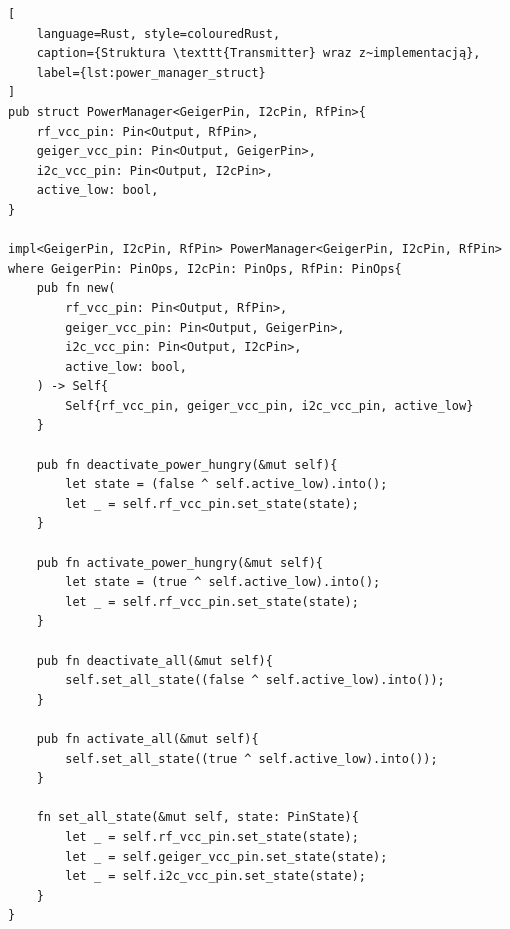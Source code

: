 \begin{lstlisting}[
    language=Rust, style=colouredRust, 
    caption={Struktura \texttt{Transmitter} wraz z~implementacją},
    label={lst:power_manager_struct}
]
pub struct PowerManager<GeigerPin, I2cPin, RfPin>{
    rf_vcc_pin: Pin<Output, RfPin>,
    geiger_vcc_pin: Pin<Output, GeigerPin>,
    i2c_vcc_pin: Pin<Output, I2cPin>,
    active_low: bool,
}

impl<GeigerPin, I2cPin, RfPin> PowerManager<GeigerPin, I2cPin, RfPin>
where GeigerPin: PinOps, I2cPin: PinOps, RfPin: PinOps{
    pub fn new(
        rf_vcc_pin: Pin<Output, RfPin>,
        geiger_vcc_pin: Pin<Output, GeigerPin>,
        i2c_vcc_pin: Pin<Output, I2cPin>,
        active_low: bool,
    ) -> Self{
        Self{rf_vcc_pin, geiger_vcc_pin, i2c_vcc_pin, active_low}
    }

    pub fn deactivate_power_hungry(&mut self){
        let state = (false ^ self.active_low).into();
        let _ = self.rf_vcc_pin.set_state(state);
    }

    pub fn activate_power_hungry(&mut self){
        let state = (true ^ self.active_low).into();
        let _ = self.rf_vcc_pin.set_state(state);
    }

    pub fn deactivate_all(&mut self){
        self.set_all_state((false ^ self.active_low).into());
    }

    pub fn activate_all(&mut self){
        self.set_all_state((true ^ self.active_low).into());
    }

    fn set_all_state(&mut self, state: PinState){
        let _ = self.rf_vcc_pin.set_state(state);
        let _ = self.geiger_vcc_pin.set_state(state);
        let _ = self.i2c_vcc_pin.set_state(state);
    }
}
\end{lstlisting}